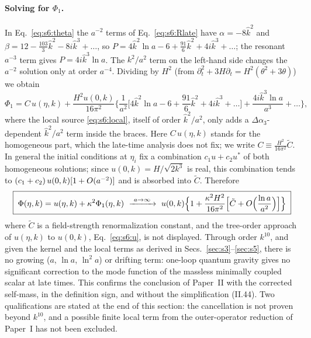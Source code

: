 \documentclass[aps,prd,onecolumn,10pt,nofootinbib,floatfix]{revtex4-2}
\newcommand{\PI}{Paper~I}
\newcommand{\PII}{Paper~II}
\newcommand{\eqII}[1]{(II.#1)}
\newcommand{\khat}{\hat k}
\begin{document}
\paragraph*{Solving for $\Phi_1$.}
In Eq.~\eqref{eq:s6:theta} the $a^{-2}$ terms of Eq.~\eqref{eq:s6:Rlate} have $\alpha=-8\khat^2$ and
$\beta=12-\frac{103}3\khat^2-8i\khat^3+\ldots$, so $P=4\khat^2\ln a-6+\frac{91}6\khat^2+4i\khat^3+\ldots$; the resonant
$a^{-3}$ term gives $P=4i\khat^3\ln a$. The $k^2/a^2$ term on the left-hand side changes the $a^{-2}$ solution only at
order $a^{-4}$. Dividing by $H^2$ (from $\partial_t^2+3H\partial_t=H^2(\theta^2+3\theta)$) we obtain
\begin{equation}
\Phi_1=C\,u(\eta,k)+\frac{H^2u(0,k)}{16\pi^2}\bigg\{\frac{1}{a^2}\Big[4\khat^2\ln a-6+\frac{91}6\khat^2+4i\khat^3+\ldots\Big]
+\frac{4i\khat^3\ln a}{a^3}+\ldots\bigg\},
\label{eq:s6:Phi1}
\end{equation}
where the local source \eqref{eq:s6:local}, itself of order $\khat^2/a^2$, only adds a $\Delta\alpha_3$-dependent
$\khat^2/a^2$ term inside the braces. Here $C\,u(\eta,k)$ stands for the homogeneous part, which the
late-time analysis does not fix; we write $C\equiv\frac{H^2}{16\pi^2}\tilde C$. In general the initial conditions at $\eta_i$ fix a
combination $c_1u+c_2u^*$ of both homogeneous solutions; since $u(0,k)=H/\sqrt{2k^3}$ is real, this combination tends to
$(c_1+c_2)\,u(0,k)[1+O(a^{-2})]$ and is absorbed into $\tilde C$. Therefore
\begin{equation}
\boxed{\;\Phi(\eta,k)=u(\eta,k)+\kappa^2\Phi_1(\eta,k)\ \xrightarrow{\ a\to\infty\ }\
u(0,k)\Big\{1+\frac{\kappa^2H^2}{16\pi^2}\Big[\tilde C+\sixO\Big(\frac{\ln a}{a^2}\Big)\Big]\Big\}\;}
\label{eq:s6:final}
\end{equation}
where $\tilde C$ is a field-strength renormalization constant, and the tree-order approach of $u(\eta,k)$ to $u(0,k)$,
Eq.~\eqref{eq:s6:u}, is not displayed. Through order $k^{10}$, and given the kernel and the local terms as derived in
Secs.~\ref{sec:s3}--\ref{sec:s5}, there is no growing ($a$, $\ln a$, $\ln^2a$) or drifting term: one-loop quantum gravity gives
no significant correction to the mode function of the massless minimally coupled scalar at late times. This confirms the
conclusion of \PII{} with the corrected self-mass, in the definition sign, and without the simplification \eqII{44}. Two
qualifications are stated at the end of this section: the cancellation is not proven beyond $k^{10}$, and a possible finite local
term from the outer-operator reduction of \PI{} has not been excluded.
\end{document}
